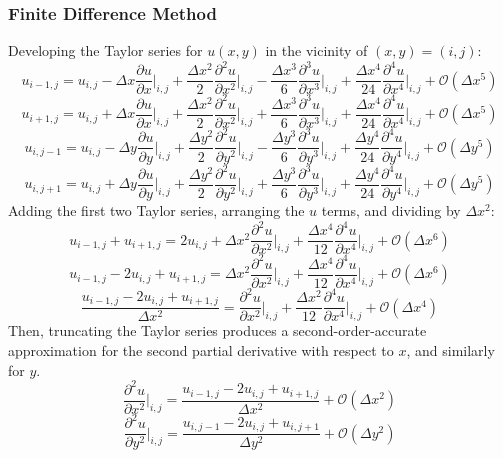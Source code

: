 \documentclass[10pt]{article}		%
\numberwithin{equation}{section}
\newcommand{\pder}[2]{\frac{\partial#1}{\partial#2}}			%
\newcommand{\psder}[2]{\dfrac{\partial^2#1}{\partial#2^2}}		%
\newcommand{\ptder}[2]{\dfrac{\partial^3#1}{\partial#2^3}}		%
\newcommand{\pfder}[2]{\dfrac{\partial^4#1}{\partial#2^4}}		%
\begin{document}
\subsubsection{Finite Difference Method}
Developing the Taylor series for $u(x, y)$ in the vicinity of $(x,y) = (i,j)$:
\begin{equation}
u_{i-1, j} = u_{i,j} - \Delta x \pder{u}{x}\Big|_{i,j} + \frac{\Delta x^2}{2} \psder{u}{x}\Big|_{i,j} - \frac{\Delta x^3}{6} \ptder{u}{x}\Big|_{i,j} + \frac{\Delta x^4}{24} \pfder{u}{x}\Big|_{i,j} + \mathcal{O}(\Delta x^5)
\end{equation}
\begin{equation}
u_{i+1, j} = u_{i,j} + \Delta x \pder{u}{x}\Big|_{i,j} + \frac{\Delta x^2}{2} \psder{u}{x}\Big|_{i,j} + \frac{\Delta x^3}{6} \ptder{u}{x}\Big|_{i,j} + \frac{\Delta x^4}{24} \pfder{u}{x}\Big|_{i,j} + \mathcal{O}(\Delta x^5)
\end{equation}
\begin{equation}
u_{i, j-1} = u_{i,j} - \Delta y \pder{u}{y}\Big|_{i,j} + \frac{\Delta y^2}{2} \psder{u}{y}\Big|_{i,j} - \frac{\Delta y^3}{6} \ptder{u}{y}\Big|_{i,j} + \frac{\Delta y^4}{24} \pfder{u}{y}\Big|_{i,j} + \mathcal{O}(\Delta y^5)
\end{equation}
\begin{equation}
u_{i, j+1} = u_{i,j} + \Delta y \pder{u}{y}\Big|_{i,j} + \frac{\Delta y^2}{2} \psder{u}{y}\Big|_{i,j} + \frac{\Delta y^3}{6} \ptder{u}{y}\Big|_{i,j} + \frac{\Delta y^4}{24} \pfder{u}{y}\Big|_{i,j} + \mathcal{O}(\Delta y^5)
\end{equation}
Adding the first two Taylor series, arranging the $u$ terms, and dividing by $\Delta x^2$:
\begin{equation}
u_{i-1, j} + u_{i+1, j} = 2u_{i,j} + {\Delta x^2} \psder{u}{x}\Big|_{i,j} + \frac{\Delta x^4}{12} \pfder{u}{x}\Big|_{i,j} + \mathcal{O}(\Delta x^6)
\end{equation}
\begin{equation}
u_{i-1, j} - 2u_{i,j} + u_{i+1, j} = {\Delta x^2} \psder{u}{x}\Big|_{i,j} + \frac{\Delta x^4}{12} \pfder{u}{x}\Big|_{i,j} + \mathcal{O}(\Delta x^6)
\end{equation}
\begin{equation}
\frac{u_{i-1, j} - 2u_{i,j} + u_{i+1, j}}{\Delta x^2} = \psder{u}{x}\Big|_{i,j} + \frac{\Delta x^2}{12} \pfder{u}{x}\Big|_{i,j} + \mathcal{O}(\Delta x^4)
\end{equation}
Then, truncating the Taylor series produces a second-order-accurate approximation for the second partial derivative with respect to $x$, and similarly for $y$.
\begin{equation}
\label{eqn:2ox}
\psder{u}{x}\Big|_{i,j} = \frac{u_{i-1, j} - 2u_{i,j} + u_{i+1, j}}{\Delta x^2} + \mathcal{O}(\Delta x^2)
\end{equation}
\begin{equation}
\label{eqn:2oy}
\psder{u}{y}\Big|_{i,j} = \frac{u_{i, j-1} - 2u_{i,j} + u_{i, j+1}}{\Delta y^2} + \mathcal{O}(\Delta y^2)
\end{equation}
\end{document}
